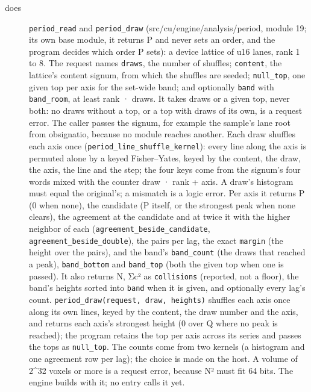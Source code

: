 \begin{description}
\item[{does}] \texttt{period\_\allowbreak{}read} and \texttt{period\_\allowbreak{}draw} (src/cu/engine/analysis/period, module 19; its own base module, it returns P and never sets an order, and the program decides which order P sets): a device lattice of u16 lanes, rank 1 to 8. The request names \texttt{draws}, the number of shuffles; \texttt{content}, the lattice's content signum, from which the shuffles are seeded; \texttt{null\_\allowbreak{}top}, one given top per axis for the set-wide band; and optionally \texttt{band} with \texttt{band\_\allowbreak{}room}, at least rank · draws. It takes draws or a given top, never both: no draws without a top, or a top with draws of its own, is a request error. The caller passes the signum, for example the sample's lane root from obsignatio, because no module reaches another. Each draw shuffles each axis once (\texttt{period\_\allowbreak{}line\_\allowbreak{}shuffle\_\allowbreak{}kernel}): every line along the axis is permuted alone by a keyed Fisher–Yates, keyed by the content, the draw, the axis, the line and the step; the four keys come from the signum's four words mixed with the counter draw · rank + axis. A draw's histogram must equal the original's; a mismatch is a logic error. Per axis it returns P (0 when none), the candidate (P itself, or the strongest peak when none clears), the agreement at the candidate and at twice it with the higher neighbor of each (\texttt{agreement\_\allowbreak{}beside\_\allowbreak{}candidate}, \texttt{agreement\_\allowbreak{}beside\_\allowbreak{}double}), the pairs per lag, the exact \texttt{margin} (the height over the pairs), and the band's \texttt{band\_\allowbreak{}count} (the draws that reached a peak), \texttt{band\_\allowbreak{}bottom} and \texttt{band\_\allowbreak{}top} (both the given top when one is passed). It also returns N, Σc² as \texttt{collisions} (reported, not a floor), the band's heights sorted into \texttt{band} when it is given, and optionally every lag's count. \texttt{period\_\allowbreak{}draw(request, draw, heights)} shuffles each axis once along its own lines, keyed by the content, the draw number and the axis, and returns each axis's strongest height (0 over Q where no peak is reached); the program retains the top per axis across its series and passes the tops as \texttt{null\_\allowbreak{}top}. The counts come from two kernels (a histogram and one agreement row per lag); the choice is made on the host. A volume of 2\textasciicircum{}32 voxels or more is a request error, because N² must fit 64 bits. The engine builds with it; no entry calls it yet.

\end{description}
